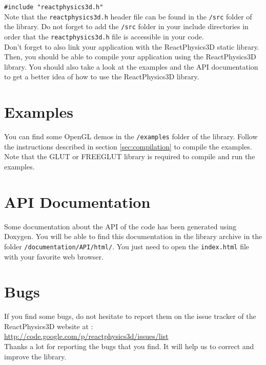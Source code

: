 \documentclass[a4paper,12pt]{article}
\begin{document}
    \texttt{\#include "reactphysics3d.h"} \\

    Note that the \texttt{reactphysics3d.h} header file can be found in the
    \texttt{/src} folder of the library. Do not forget to add the
    \texttt{/src} folder in your include directories in order that the
    \texttt{reactphysics3d.h} file is accessible in your code. \\

    Don't forget to also link your application with the ReactPhysics3D
    static library.  \\
  
    Then, you should be able to compile your application using the
    ReactPhysics3D library. You should also take a look at the
    examples and the API documentation to get a better idea of how to use the
    ReactPhysics3D library.

    \section{Examples}

    You can find some OpenGL demos in the \texttt{/examples} folder of
    the library. Follow the instructions described in section
    \ref{sec:compilation} to
    compile the examples. Note that the GLUT or FREEGLUT library is required to
    compile and run the examples.

   \section{API Documentation}

   Some documentation about the API of the code has been generated
   using Doxygen. You will be able to find this documentation in the library archive in the folder \texttt{/documentation/API/html/}. You just
   need to open the \texttt{index.html} file with your favorite web browser.

    \section{Bugs}

    If you find some bugs, do not hesitate to report them on the issue tracker of the ReactPhysics3D website at : \\

    \url{http://code.google.com/p/reactphysics3d/issues/list} \\

    Thanks a lot for reporting the bugs that you find. It will help us to correct and improve the library.
   
\end{document}
